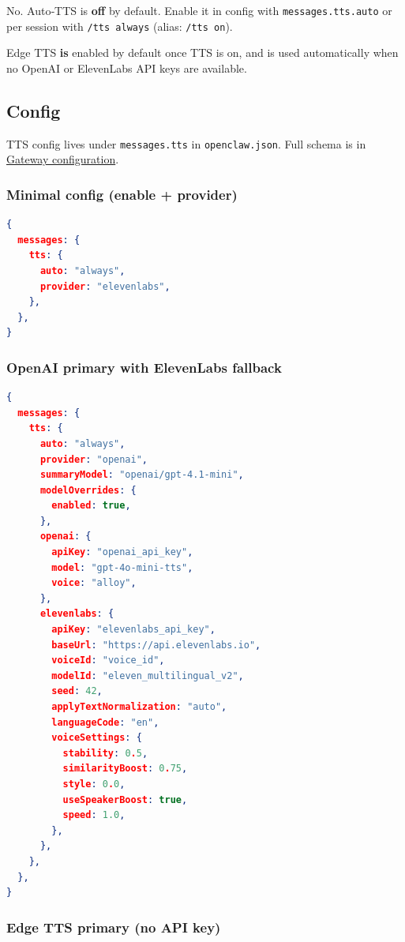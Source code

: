 No. Auto‑TTS is \textbf{off} by default. Enable it in config with
\texttt{messages.tts.auto} or per session with \texttt{/tts always} (alias: \texttt{/tts on}).

Edge TTS \textbf{is} enabled by default once TTS is on, and is used automatically
when no OpenAI or ElevenLabs API keys are available.

\subsection{Config}


TTS config lives under \texttt{messages.tts} in \texttt{openclaw.json}.
Full schema is in \href{/gateway/configuration}{Gateway configuration}.

\subsubsection{Minimal config (enable + provider)}


\begin{lstlisting}[language=json]
{
  messages: {
    tts: {
      auto: "always",
      provider: "elevenlabs",
    },
  },
}
\end{lstlisting}


\subsubsection{OpenAI primary with ElevenLabs fallback}


\begin{lstlisting}[language=json]
{
  messages: {
    tts: {
      auto: "always",
      provider: "openai",
      summaryModel: "openai/gpt-4.1-mini",
      modelOverrides: {
        enabled: true,
      },
      openai: {
        apiKey: "openai_api_key",
        model: "gpt-4o-mini-tts",
        voice: "alloy",
      },
      elevenlabs: {
        apiKey: "elevenlabs_api_key",
        baseUrl: "https://api.elevenlabs.io",
        voiceId: "voice_id",
        modelId: "eleven_multilingual_v2",
        seed: 42,
        applyTextNormalization: "auto",
        languageCode: "en",
        voiceSettings: {
          stability: 0.5,
          similarityBoost: 0.75,
          style: 0.0,
          useSpeakerBoost: true,
          speed: 1.0,
        },
      },
    },
  },
}
\end{lstlisting}


\subsubsection{Edge TTS primary (no API key)}


